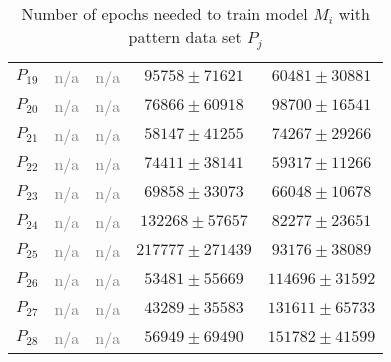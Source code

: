 \documentclass[anon]{CI}
\begin{document}
\begin{table}[H]
\begin{tabular}{ccccc}
				$P_{19}$  & \textcolor{gray}{n/a}  & \textcolor{gray}{n/a}  & $95758\pm71621$  & $60481\pm30881$ \\
				$P_{20}$  & \textcolor{gray}{n/a}  & \textcolor{gray}{n/a}  & $76866\pm60918$  & $98700\pm16541$ \\
				$P_{21}$  & \textcolor{gray}{n/a}  & \textcolor{gray}{n/a}  & $58147\pm41255$  & $74267\pm29266$ \\
				$P_{22}$  & \textcolor{gray}{n/a}  & \textcolor{gray}{n/a}  & $74411\pm38141$  & $59317\pm11266$ \\
				$P_{23}$  & \textcolor{gray}{n/a}  & \textcolor{gray}{n/a}  & $69858\pm33073$  & $66048\pm10678$ \\
				$P_{24}$  & \textcolor{gray}{n/a}  & \textcolor{gray}{n/a}  & $132268\pm57657$  & $82277\pm23651$ \\
				$P_{25}$  & \textcolor{gray}{n/a}  & \textcolor{gray}{n/a}  & $217777\pm271439$  & $93176\pm38089$ \\
				$P_{26}$  & \textcolor{gray}{n/a}  & \textcolor{gray}{n/a}  & $53481\pm55669$  & $114696\pm31592$ \\
				$P_{27}$  & \textcolor{gray}{n/a}  & \textcolor{gray}{n/a}  & $43289\pm35583$  & $131611\pm65733$ \\
				$P_{28}$  & \textcolor{gray}{n/a}  & \textcolor{gray}{n/a}  & $56949\pm69490$  & $151782\pm41599$ \\
				
			\end{tabular}
			\caption{Number of epochs needed to train model $M_i$ with pattern data set $P_j$}
		\end{table}
		
		
		
\end{document}
